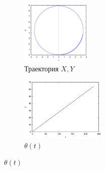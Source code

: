 \begin{figure}
    \centering
    \begin{subfigure}[t]{0.3\textwidth}
        \centering
        \includegraphics[width=\linewidth, height=30mm]{pic/_sol__1_0_1__0__230__1e2_trajectory}
        \caption{Траектория $X, Y$}
        \label{fig:_sol__1_0_1__0__230__1e2_trajectory}
    \end{subfigure}
    \begin{subfigure}[t]{0.3\textwidth}
        \centering
        \includegraphics[width=\linewidth, height=30mm]{pic/_sol__1_0_1__0__230__1e2_theta}
        \caption{$\theta(t)$}
        \label{fig:_sol__1_0_1__0__230__1e2_theta}
    \end{subfigure}
    \vspace{12pt}
    

\end{figure}
